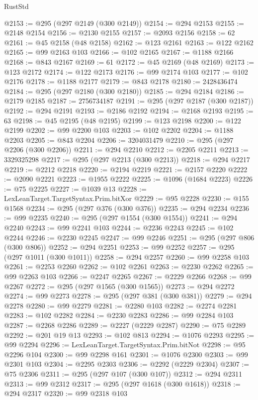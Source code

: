 \begin{lexlean}{RustStd}
\begin{coremodule}
@2153 := @295 (@297 @2149 (@300 @2149))
@2154 := @294 @2153
@2155 := @2148 @2154
@2156 := @2130 @2155
@2157 := @2093 @2156
@2158 := 62
@2161 := @45 @2158 (@48 @2158)
@2162 := @123 @2161
@2163 := @122 @2162
@2165 := @99 @2163 @103
@2166 := @102 @2165
@2167 := @1188 @2166
@2168 := @843 @2167
@2169 := 61
@2172 := @45 @2169 (@48 @2169)
@2173 := @123 @2172
@2174 := @122 @2173
@2176 := @99 @2174 @103
@2177 := @102 @2176
@2178 := @1188 @2177
@2179 := @843 @2178
@2180 := 2428436474
@2184 := @295 (@297 @2180 (@300 @2180))
@2185 := @294 @2184
@2186 := @2179 @2185
@2187 := 2756734187
@2191 := @295 (@297 @2187 (@300 @2187))
@2192 := @294 @2191
@2193 := @2186 @2192
@2194 := @2168 @2193
@2195 := 63
@2198 := @45 @2195 (@48 @2195)
@2199 := @123 @2198
@2200 := @122 @2199
@2202 := @99 @2200 @103
@2203 := @102 @2202
@2204 := @1188 @2203
@2205 := @843 @2204
@2206 := 3204031479
@2210 := @295 (@297 @2206 (@300 @2206))
@2211 := @294 @2210
@2212 := @2205 @2211
@2213 := 3329325298
@2217 := @295 (@297 @2213 (@300 @2213))
@2218 := @294 @2217
@2219 := @2212 @2218
@2220 := @2194 @2219
@2221 := @2157 @2220
@2222 := @2090 @2221
@2223 := @1955 @2222
@2225 := @1096 (@1684 @2223)
@2226 := @75 @2225
@2227 := @1039 @13
@2228 := LexLeanTarget.TargetSyntax.Prim.bitXor
@2229 := @95 @2228
@2230 := @155 @1568
@2234 := @295 (@297 @376 (@300 @376))
@2235 := @294 @2234
@2236 := @99 @2235
@2240 := @295 (@297 @1554 (@300 @1554))
@2241 := @294 @2240
@2243 := @99 @2241 @103
@2244 := @2236 @2243
@2245 := @102 @2244
@2246 := @2230 @2245
@2247 := @99 @2246
@2251 := @295 (@297 @806 (@300 @806))
@2252 := @294 @2251
@2253 := @99 @2252
@2257 := @295 (@297 @1011 (@300 @1011))
@2258 := @294 @2257
@2260 := @99 @2258 @103
@2261 := @2253 @2260
@2262 := @102 @2261
@2263 := @2230 @2262
@2265 := @99 @2263 @103
@2266 := @2247 @2265
@2267 := @2229 @2266
@2268 := @99 @2267
@2272 := @295 (@297 @1565 (@300 @1565))
@2273 := @294 @2272
@2274 := @99 @2273
@2278 := @295 (@297 @381 (@300 @381))
@2279 := @294 @2278
@2280 := @99 @2279
@2281 := @2280 @103
@2282 := @2274 @2281
@2283 := @102 @2282
@2284 := @2230 @2283
@2286 := @99 @2284 @103
@2287 := @2268 @2286
@2289 := @2227 (@2229 @2287)
@2290 := @75 @2289
@2292 := @201 @19 @13
@2293 := @102 @813
@2294 := @1076 @2293
@2295 := @99 @2294
@2296 := LexLeanTarget.TargetSyntax.Prim.bitNot
@2298 := @95 @2296 @104
@2300 := @99 @2298 @161
@2301 := @1076 @2300
@2303 := @99 @2301 @103
@2304 := @2295 @2303
@2306 := @2292 (@2229 @2304)
@2307 := @75 @2306
@2311 := @295 (@297 @107 (@300 @107))
@2312 := @294 @2311
@2313 := @99 @2312
@2317 := @295 (@297 @1618 (@300 @1618))
@2318 := @294 @2317
@2320 := @99 @2318 @103

\end{coremodule}
\end{lexlean}
